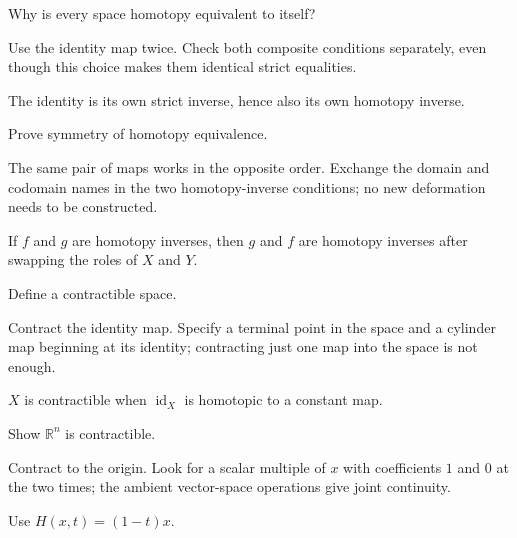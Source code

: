 \begin{exercise}\label{exr:viii02-02}
Why is every space homotopy equivalent to itself?
\end{exercise}
\begin{hint}Use the identity map twice.
Check both composite conditions separately, even though this choice makes them identical strict equalities.
\end{hint}
\begin{solution}
The identity is its own strict inverse, hence also its own homotopy inverse.
\end{solution}

\begin{exercise}\label{exr:viii02-03}
Prove symmetry of homotopy equivalence.
\end{exercise}
\begin{hint}The same pair of maps works in the opposite order.
Exchange the domain and codomain names in the two homotopy-inverse conditions; no new deformation needs to be constructed.
\end{hint}
\begin{solution}
If \(f\) and \(g\) are homotopy inverses, then \(g\) and \(f\) are homotopy
inverses after swapping the roles of \(X\) and \(Y\).
\end{solution}

\begin{exercise}\label{exr:viii02-04}
Define a contractible space.
\end{exercise}
\begin{hint}Contract the identity map.
Specify a terminal point in the space and a cylinder map beginning at its identity; contracting just one map into the space is not enough.
\end{hint}
\begin{solution}
\(X\) is contractible when \(\operatorname{id}_X\) is homotopic to a constant map.
\end{solution}

\begin{exercise}\label{exr:viii02-05}
Show \(\mathbb R^n\) is contractible.
\end{exercise}
\begin{hint}Contract to the origin.
Look for a scalar multiple of \(x\) with coefficients \(1\) and \(0\) at the two times; the ambient vector-space operations give joint continuity.
\end{hint}
\begin{solution}
Use \(H(x,t)=(1-t)x\).
\end{solution}

